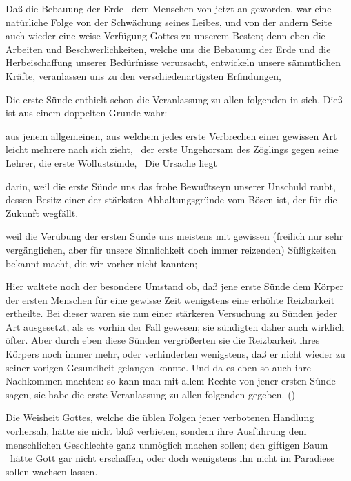 \begin{aufza}
\item Daß die Bebauung der Erde \usw\ dem Menschen von jetzt an  geworden, war eine natürliche Folge von der Schwächung seines Leibes, und von der andern Seite auch wieder eine weise Verfügung Gottes zu unserem Besten; denn eben die Arbeiten und Beschwerlichkeiten, welche uns die Bebauung der Erde und die Herbeischaffung unserer Bedürfnisse verursacht, entwickeln unsere sämmtlichen Kräfte, veranlassen uns zu den verschiedenartigsten Erfindungen, \usw\
\item Die erste Sünde enthielt schon die Veranlassung zu allen folgenden in sich. Dieß ist aus einem doppelten Grunde wahr:
\begin{aufzb}
\item aus jenem allgemeinen, aus welchem jedes erste Verbrechen einer gewissen Art leicht mehrere nach sich zieht, \zB\ der erste Ungehorsam des Zöglings gegen seine Lehrer, die erste Wollustsünde, \usw\ Die Ursache liegt
\begin{aufzc}
\item darin, weil die erste Sünde uns das frohe Bewußtseyn unserer Unschuld raubt, dessen Besitz einer der stärksten Abhaltungsgründe vom Bösen ist, der für die Zukunft wegfällt.
\item weil die Verübung der ersten Sünde uns meistens mit gewissen (freilich nur sehr vergänglichen, aber für unsere Sinnlichkeit doch immer reizenden) Süßigkeiten bekannt macht, die wir vorher nicht kannten; \usw\
\end{aufzc}
\item Hier waltete noch der besondere Umstand ob, daß jene erste Sünde dem Körper der ersten Menschen für eine gewisse Zeit wenigstens eine erhöhte Reizbarkeit ertheilte. Bei dieser waren sie nun einer stärkeren Versuchung zu Sünden jeder Art ausgesetzt, als es vorhin der Fall gewesen; sie sündigten daher auch wirklich öfter. Aber durch eben diese Sünden vergrößerten sie die Reizbarkeit ihres Körpers noch immer mehr, oder verhinderten wenigstens, daß er nicht wieder zu seiner vorigen Gesundheit gelangen konnte. Und da es eben so auch ihre Nachkommen machten: so kann man mit allem Rechte von jener ersten Sünde sagen, sie habe die erste Veranlassung zu allen folgenden gegeben. ()\par
\end{aufzb}
\end{aufza}
 Die Weisheit Gottes, welche die üblen Folgen jener verbotenen Handlung vorhersah, hätte sie nicht bloß verbieten, sondern ihre Ausführung dem menschlichen Geschlechte ganz unmöglich machen sollen; den giftigen Baum \zB\ hätte Gott gar nicht erschaffen, oder doch wenigstens ihn nicht im Paradiese sollen wachsen lassen.\par
